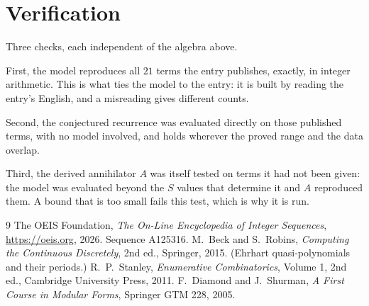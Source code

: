 \documentclass[11pt,a4paper]{article}
\theoremstyle{plain}
\theoremstyle{definition}
\begin{document}
\section{Verification}

Three checks, each independent of the algebra above.

First, the model reproduces all $21$ terms the entry publishes, exactly, in integer
arithmetic. This is what ties the model to the entry: it is built by reading the entry's
English, and a misreading gives different counts.

Second, the conjectured recurrence was evaluated directly on those published terms, with no
model involved, and holds wherever the proved range and the data overlap.

Third, the derived annihilator $A$ was itself tested on terms it had not been given: the model
was evaluated beyond the $S$ values that determine it and $A$ reproduced them. A bound that is
too small fails this test, which is why it is run.

\begin{thebibliography}{9}
 The OEIS Foundation, \emph{The On-Line Encyclopedia of Integer
Sequences}, \url{https://oeis.org}, 2026. Sequence A125316.
 M.~Beck and S.~Robins, \emph{Computing the Continuous Discretely},
2nd ed., Springer, 2015. (Ehrhart quasi-polynomials and their periods.)
 R.~P.~Stanley, \emph{Enumerative Combinatorics}, Volume 1, 2nd ed.,
Cambridge University Press, 2011.
 F.~Diamond and J.~Shurman, \emph{A First Course in Modular Forms},
Springer GTM 228, 2005.
\end{thebibliography}
\end{document}
